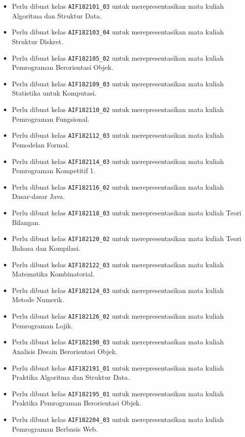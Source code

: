 \documentclass[a4paper,twoside]{article}
\begin{document}
\begin{enumerate}
\begin{enumerate}
\begin{enumerate}
\begin{itemize}
					\item Perlu dibuat kelas \texttt{AIF182101\_03} untuk merepresentasikan mata kuliah Algoritma dan Struktur Data.
					\item Perlu dibuat kelas \texttt{AIF182103\_04} untuk merepresentasikan mata kuliah Struktur Diskret.
					\item Perlu dibuat kelas \texttt{AIF182105\_02} untuk merepresentasikan mata kuliah Pemrograman Berorientasi Objek.
					\item Perlu dibuat kelas \texttt{AIF182109\_03} untuk merepresentasikan mata kuliah Statistika untuk Komputasi.
					\item Perlu dibuat kelas \texttt{AIF182110\_02} untuk merepresentasikan mata kuliah Pemrograman Fungsional.
					\item Perlu dibuat kelas \texttt{AIF182112\_03} untuk merepresentasikan mata kuliah Pemodelan Formal.
					\item Perlu dibuat kelas \texttt{AIF182114\_03} untuk merepresentasikan mata kuliah Pemrograman Kompetitif 1.
					\item Perlu dibuat kelas \texttt{AIF182116\_02} untuk merepresentasikan mata kuliah Dasar-dasar Java.
					\item Perlu dibuat kelas \texttt{AIF182118\_03} untuk merepresentasikan mata kuliah Teori Bilangan.
					\item Perlu dibuat kelas \texttt{AIF182120\_02} untuk merepresentasikan mata kuliah Teori Bahasa dan Kompilasi.
					\item Perlu dibuat kelas \texttt{AIF182122\_03} untuk merepresentasikan mata kuliah Matematika Kombinatorial.
					\item Perlu dibuat kelas \texttt{AIF182124\_03} untuk merepresentasikan mata kuliah Metode Numerik.
					\item Perlu dibuat kelas \texttt{AIF182126\_02} untuk merepresentasikan mata kuliah Pemrograman Lojik.
					\item Perlu dibuat kelas \texttt{AIF182190\_03} untuk merepresentasikan mata kuliah Analisis Desain Berorientasi  Objek.
					\item Perlu dibuat kelas \texttt{AIF182191\_01} untuk merepresentasikan mata kuliah Praktika Algoritma dan Struktur Data.
					\item Perlu dibuat kelas \texttt{AIF182195\_01} untuk merepresentasikan mata kuliah Praktika Pemrograman Berorientasi Objek.
					\item Perlu dibuat kelas \texttt{AIF182204\_03} untuk merepresentasikan mata kuliah Pemrograman Berbasis Web.

\end{itemize}
\end{enumerate}
\end{enumerate}
\end{enumerate}
\end{document}

